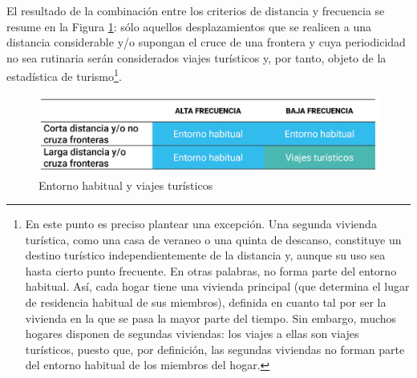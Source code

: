 \documentclass[
  openany]{book}
\begin{document}
El resultado de la combinación entre los criterios de distancia y frecuencia se resume en la Figura \ref{fig:entornoYviajes}: sólo aquellos desplazamientos que se realicen a una distancia considerable y/o supongan el cruce de una frontera y cuya periodicidad no sea rutinaria serán considerados viajes turísticos y, por tanto, objeto de la estadística de turismo\footnote{En este punto es preciso plantear una excepción. Una segunda vivienda turística, como una casa de veraneo o una quinta de descanso, constituye un destino turístico independientemente de la distancia y, aunque su uso sea hasta cierto punto frecuente. En otras palabras, no forma parte del entorno habitual. Así, cada hogar tiene una vivienda principal (que determina el lugar de residencia habitual de sus miembros), definida en cuanto tal por ser la vivienda en la que se pasa la mayor parte del tiempo. Sin embargo, muchos hogares disponen de segundas viviendas: los viajes a ellas son viajes turísticos, puesto que, por definición, las segundas viviendas no forman parte del entorno habitual de los miembros del hogar.}.

\begin{figure}

{\centering \includegraphics[width=0.8\linewidth]{imagenes/figura1.1} 

}

\caption{Entorno habitual y viajes turísticos}\label{fig:entornoYviajes}
\end{figure}
\end{document}

